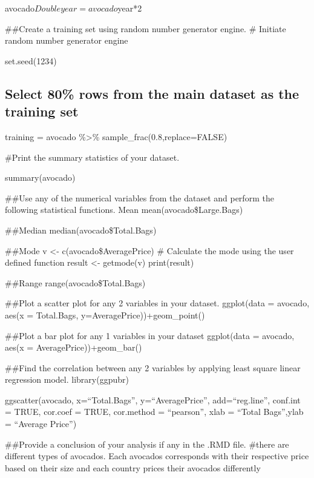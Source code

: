 \documentclass[
]{article}
\begin{document}
avocado\(Doubleyear = avocado\)year*2

\#\#Create a training set using random number generator engine. \#
Initiate random number generator engine

set.seed(1234)

\hypertarget{select-80-rows-from-the-main-dataset-as-the-training-set}{%
\subsection{Select 80\% rows from the main dataset as the training
set}\label{select-80-rows-from-the-main-dataset-as-the-training-set}}

training = avocado \%\textgreater\% sample\_frac(0.8,replace=FALSE)

\#Print the summary statistics of your dataset.

summary(avocado)

\#\#Use any of the numerical variables from the dataset and perform the
following statistical functions. Mean mean(avocado\$Large.Bags)

\#\#Median median(avocado\$Total.Bags)

\#\#Mode v \textless- c(avocado\$AveragePrice) \# Calculate the mode
using the user defined function result \textless- getmode(v)
print(result)

\#\#Range range(avocado\$Total.Bags)

\#\#Plot a scatter plot for any 2 variables in your dataset. ggplot(data
= avocado, aes(x = Total.Bags, y=AveragePrice))+geom\_point()

\#\#Plot a bar plot for any 1 variables in your dataset ggplot(data =
avocado, aes(x = AveragePrice))+geom\_bar()

\#\#Find the correlation between any 2 variables by applying least
square linear regression model. library(ggpubr)

ggscatter(avocado, x=``Total.Bags'', y=``AveragePrice'',
add=``reg.line'', conf.int = TRUE, cor.coef = TRUE, cor.method =
``pearson'', xlab = ``Total Bags'',ylab = ``Average Price'')

\#\#Provide a conclusion of your analysis if any in the .RMD file.
\#there are different types of avocados. Each avocados corresponds with
their respective price based on their size and each country prices their
avocados differently
\end{document}
